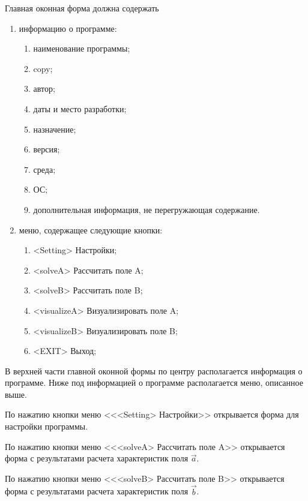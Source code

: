 \documentclass[14pt,a4paper,final]{extreport}
\begin{document}
Главная оконная форма должна содержать 
\begin{enumerate}[label=\arabic*.,ref=\arabic*]
	\item информацию о программе:
		\begin{enumerate}[label=\asbuk*)]
			\item наименование программы;
			\item copy;
			\item автор;
			\item даты и место разработки;
			\item назначение;

\pagebreak %

			\item версия;
			\item среда;
			\item ОС;
			\item дополнительная информация, не перегружающая содержание.
		\end{enumerate}
	\item меню, содержащее следующие кнопки:
		\begin{enumerate}[label=\asbuk*)]
			\item <Setting> Настройки;
			\item <solveA> Рассчитать поле A;
			\item  <solveB> Рассчитать поле B;
			\item <visualizeA> Визуализировать поле A;
			\item <visualizeB> Визуализировать поле B;
			\item <EXIT> Выход;
		\end{enumerate}
\end{enumerate}




В верхней части главной оконной формы по центру располагается информация о программе.
Ниже под информацией о программе располагается меню, описанное выше.

По нажатию кнопки меню <<<Setting> Настройки>> открывается форма для настройки программы.

По нажатию кнопки меню <<<solveA> Рассчитать поле A>> открывается форма с результатами расчета характеристик поля \( \vec a \).

По нажатию кнопки меню <<<solveB> Рассчитать поле B>> открывается форма с результатами расчета характеристик поля \( \vec b \).
\end{document}
